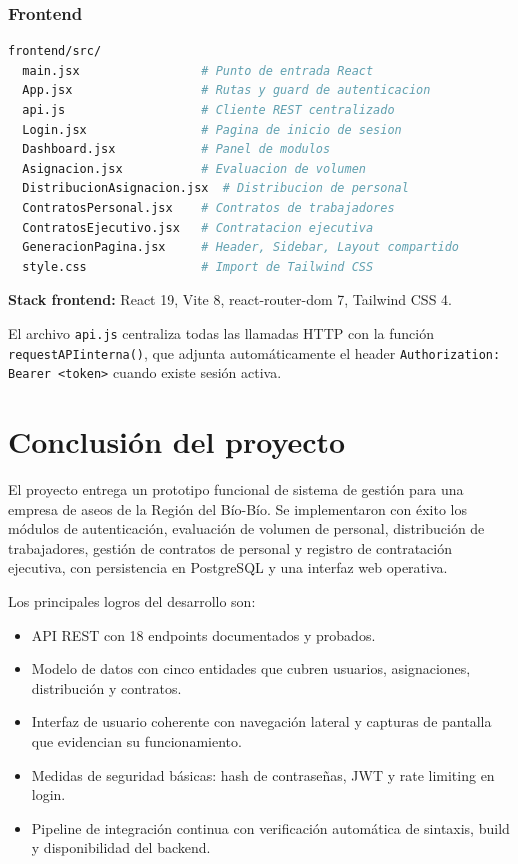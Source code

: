 \documentclass[12pt,a4paper]{report}
\begin{document}
\pagebreak
\subsection{Frontend}

\begin{lstlisting}[language=bash, caption={Estructura del directorio frontend/src/}]
frontend/src/
  main.jsx                 # Punto de entrada React
  App.jsx                  # Rutas y guard de autenticacion
  api.js                   # Cliente REST centralizado
  Login.jsx                # Pagina de inicio de sesion
  Dashboard.jsx            # Panel de modulos
  Asignacion.jsx           # Evaluacion de volumen
  DistribucionAsignacion.jsx  # Distribucion de personal
  ContratosPersonal.jsx    # Contratos de trabajadores
  ContratosEjecutivo.jsx   # Contratacion ejecutiva
  GeneracionPagina.jsx     # Header, Sidebar, Layout compartido
  style.css                # Import de Tailwind CSS
\end{lstlisting}

\textbf{Stack frontend:} React 19, Vite 8, react-router-dom 7, Tailwind CSS 4.

El archivo \texttt{api.js} centraliza todas las llamadas HTTP con la función \texttt{requestAPIinterna()}, que adjunta automáticamente el header \texttt{Authorization: Bearer <token>} cuando existe sesión activa.

\clearpage
\chapter{Conclusión del proyecto}

El proyecto entrega un prototipo funcional de sistema de gestión para una empresa de aseos de la Región del Bío-Bío. Se implementaron con éxito los módulos de autenticación, evaluación de volumen de personal, distribución de trabajadores, gestión de contratos de personal y registro de contratación ejecutiva, con persistencia en PostgreSQL y una interfaz web operativa.

Los principales logros del desarrollo son:
\begin{itemize}
  \item API REST con 18 endpoints documentados y probados.
  \item Modelo de datos con cinco entidades que cubren usuarios, asignaciones, distribución y contratos.
  \item Interfaz de usuario coherente con navegación lateral y capturas de pantalla que evidencian su funcionamiento.
  \item Medidas de seguridad básicas: hash de contraseñas, JWT y rate limiting en login.
  \item Pipeline de integración continua con verificación automática de sintaxis, build y disponibilidad del backend.
\end{itemize}
\end{document}
